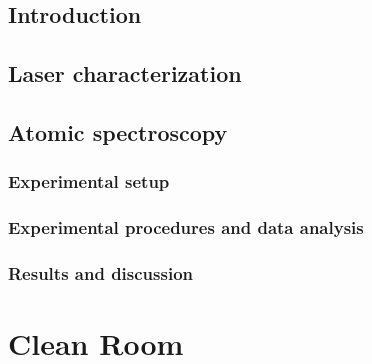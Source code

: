 \documentclass{report}
\begin{document}
\section{Introduction}



\section{Laser characterization}



\section{Atomic spectroscopy}



\subsection{Experimental setup}



\subsection{Experimental procedures and data analysis}









\subsection{Results and discussion}



\chapter{Clean Room}



\end{document}
